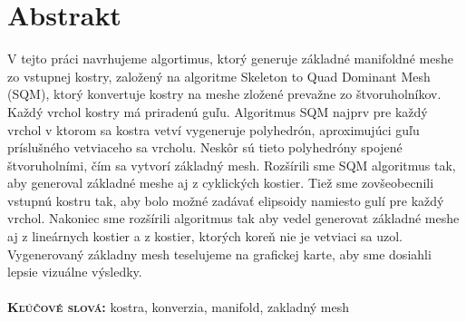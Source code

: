 \chapter{Abstrakt}
V tejto práci navrhujeme algortimus, ktorý generuje základné manifoldné meshe zo vstupnej kostry, založený na algoritme Skeleton to Quad Dominant Mesh (SQM), ktorý konvertuje kostry na meshe zložené prevažne zo štvoruholníkov.
Každý vrchol kostry má priradenú guľu.
Algoritmus SQM najprv pre každý vrchol v ktorom sa kostra vetví vygeneruje polyhedrón, aproximujúci guľu príslušného vetviaceho sa vrcholu.
Neskôr sú tieto polyhedróny spojené štvoruholními, čím sa vytvorí základný mesh.
Rozšírili sme SQM algoritmus tak, aby generoval základné meshe aj z cyklických kostier.
Tiež sme zovšeobecnili vstupnú kostru tak, aby bolo možné zadávať elipsoidy namiesto gulí pre každý vrchol.
Nakoniec sme rozšírili algoritmus tak aby vedel generovat základné meshe aj z lineárnych kostier a z kostier, ktorých koreň nie je vetviaci sa uzol.
Vygenerovaný základny mesh teselujeme na grafickej karte, aby sme dosiahli lepsie vizuálne výsledky.
\\ \\
\textbf{\textsc{Kľúčové slová:}} kostra, konverzia, manifold, zakladný mesh
